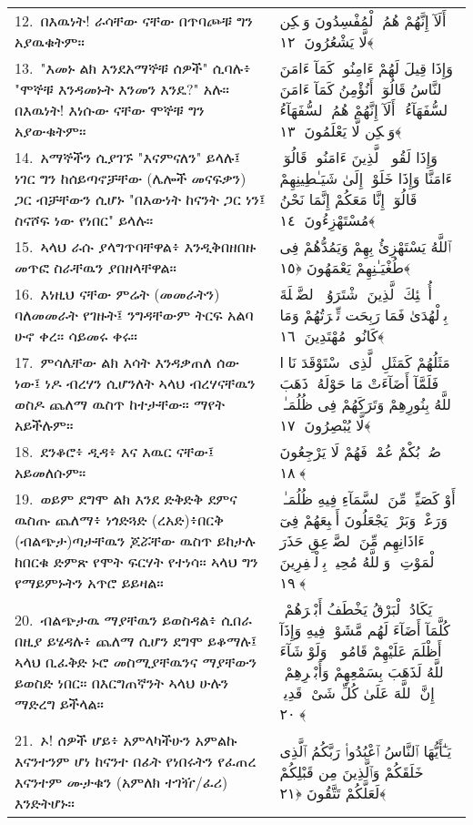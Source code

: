 \documentclass[11pt,a4paper,oneside]{article}%
\newcommand{\mytextarabic}[1]{\textarabic{ #1 \flushright}}
\begin{document}
\begin{longtable}{%
  @{}
    p{}
  @{~~~}
    p{}
    @{}
}
12.\ በእዉነት! ራሳቸው ናቸው በጥባጮቹ ግን አያዉቁትም። &  \mytextarabic{أَلَآ إِنَّهُمْ هُمُ ٱلْمُفْسِدُونَ وَلَٟكِن لَّا يَشْعُرُونَ ﴿١٢﴾} \\
13.\ "እመኑ ልክ እንደአማኞቹ ሰዎች" ሲባሉ፥ "ሞኞቹ እንዳመኑት እንመን እንዴ?" አሉ። በእዉነት! እነሱው ናቸው ሞኞቹ ግን አያውቁትም። &  \mytextarabic{وَإِذَا قِيلَ لَهُمْ ءَامِنُوا۟ كَمَآ ءَامَنَ ٱلنَّاسُ قَالُوٓا۟ أَنُؤْمِنُ كَمَآ ءَامَنَ ٱلسُّفَهَآءُ ۗ أَلَآ إِنَّهُمْ هُمُ ٱلسُّفَهَآءُ وَلَٟكِن لَّا يَعْلَمُونَ ﴿١٣﴾}   \\
14.\ አማኞችን ሲያገኙ "እናምናለን" ይላሉ፤ ነገር ግን ከሰይጣኖቻቸው (ሌሎች መናፍቃን) ጋር ብቻቸውን ሲሆኑ "በእውነት ከናንት ጋር ነን፤ ስናሾፍ ነው የነበር" ይላሉ። &  \mytextarabic{وَإِذَا لَقُوا۟ ٱلَّذِينَ ءَامَنُوا۟ قَالُوٓا۟ ءَامَنَّا وَإِذَا خَلَوْا۟ إِلَىٰ شَيَـٰطِينِهِمْ قَالُوٓا۟ إِنَّا مَعَكُمْ إِنَّمَا نَحْنُ مُسْتَهْزِءُونَ ﴿١٤﴾} \\
15.\ ኣላህ ራሱ ያላግጥባቸዋል፥ እንዲቅበዘበዙ መጥፎ ስራቸዉን ያበዘላቸዋል። &  \mytextarabic{ٱللَّهُ يَسْتَهْزِئُ بِهِمْ وَيَمُدُّهُمْ فِى طُغْيَـٰنِهِمْ يَعْمَهُونَ ﴿١٥﴾}\\ 
16.\ እነዚህ ናቸው ምሬት (መመራትን) ባለመመራት የገዙት፤ ንግዳቸውም ትርፍ አልባ ሁኖ ቀረ። ሳይመሩ ቀሩ። &  \mytextarabic{أُو۟لَٟٓئِكَ ٱلَّذِينَ ٱشْتَرَوُا۟ ٱلضَّلَٟلَةَ بِٱلْهُدَىٰ فَمَا رَبِحَت تِّجَٟرَتُهُمْ وَمَا كَانُوا۟ مُهْتَدِينَ ﴿١٦﴾} \\
17.\ ምሳሌቸው ልክ እሳት እንዳቃጠለ ሰው ነው፤ ነዶ ብረሃን ሲሆንለት ኣላህ ብረሃናቸዉን ወስዶ ጨለማ ዉስጥ ከተታቸው። ማየት  አይችሉም።
&  \mytextarabic{ مَثَلُهُمْ كَمَثَلِ ٱلَّذِى ٱسْتَوْقَدَ نَارًۭا فَلَمَّآ أَضَآءَتْ مَا حَوْلَهُۥ ذَهَبَ ٱللَّهُ بِنُورِهِمْ وَتَرَكَهُمْ فِى ظُلُمَـٰتٍۢ لَّا يُبْصِرُونَ ﴿١٧﴾}\\ 
18.\ ደንቆሮ፥ ዲዳ፥ እና እዉር ናቸው፤  አይመለሱም።  &  \mytextarabic{ صُمٌّۢ بُكْمٌ عُمْىٌۭ فَهُمْ لَا يَرْجِعُونَ ﴿١٨﴾}\\
19.\ ወይም ደግሞ ልክ እንደ ድቅድቅ ደምና  ዉስጡ ጨለማ፥ ነጎድጓድ (ረአድ)፥በርቅ  (ብልጭታ)ጣታቸዉን ጆሯቸው ዉስጥ  ይከታሉ ከበርቁ ድምጽ የሞት ፍርሃት የተነሳ።  ኣላህ ግን የማይምኑትን አጥሮ ይይዛል። &  \mytextarabic{ أَوْ كَصَيِّبٍۢ مِّنَ ٱلسَّمَآءِ فِيهِ ظُلُمَـٰتٌۭ وَرَعْدٌۭ وَبَرْقٌۭ يَجْعَلُونَ أَصَٟبِعَهُمْ فِىٓ ءَاذَانِهِم مِّنَ ٱلصَّوَٟعِقِ حَذَرَ ٱلْمَوْتِ ۚ وَٱللَّهُ مُحِيطٌۢ بِٱلْكَٟفِرِينَ ﴿١٩﴾}\\
20.\ ብልጭታዉ ማያቸዉን ይወስዳል፥ ሲበራ በዚያ ይሄዳሉ፥ ጨለማ ሲሆን ደግሞ ይቆማሉ፤ ኣላህ ቢፈቅድ ኑሮ መስሚያቸዉንና ማያቸውን ይወስድ ነበር። በእርግጠኛንት ኣላህ ሁሉን ማድረግ ይችላል። &  \mytextarabic{يَكَادُ ٱلْبَرْقُ يَخْطَفُ أَبْصَٟرَهُمْ ۖ كُلَّمَآ أَضَآءَ لَهُم مَّشَوْا۟ فِيهِ وَإِذَآ أَظْلَمَ عَلَيْهِمْ قَامُوا۟ ۚ وَلَوْ شَآءَ ٱللَّهُ لَذَهَبَ بِسَمْعِهِمْ وَأَبْصَٟرِهِمْ ۚ إِنَّ ٱللَّهَ عَلَىٰ كُلِّ شَىْءٍۢ قَدِيرٌۭ ﴿٢٠﴾}\\
21.\ ኦ! ሰዎች ሆይ፥ አምላካችሁን አምልኩ እናንተንም ሆነ ከናንተ በፊት የነበሩትን የፈጠረ እናንተም ሙታቁን (አምለክ ተገዥ/ፈሪ) እንድትሆኑ። &  \mytextarabic{يَـٰٓأَيُّهَا ٱلنَّاسُ ٱعْبُدُوا۟ رَبَّكُمُ ٱلَّذِى خَلَقَكُمْ وَٱلَّذِينَ مِن قَبْلِكُمْ لَعَلَّكُمْ تَتَّقُونَ ﴿٢١﴾}\\

\end{longtable}
\end{document}
